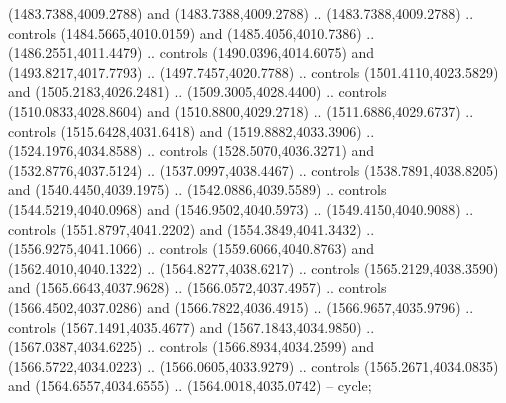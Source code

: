 \begin{scope}[shift={(-343.28256,-575.56596)}]
\begin{scope}[shift={(-736.04956,-3272.8657)}]
\begin{scope}[cm={{0.85919,0.0,0.0,0.85919,(160.29778,612.34137)}}]
        (1483.7388,4009.2788) and (1483.7388,4009.2788) .. (1483.7388,4009.2788) ..
        controls (1484.5665,4010.0159) and (1485.4056,4010.7386) ..
        (1486.2551,4011.4479) .. controls (1490.0396,4014.6075) and
        (1493.8217,4017.7793) .. (1497.7457,4020.7788) .. controls
        (1501.4110,4023.5829) and (1505.2183,4026.2481) .. (1509.3005,4028.4400) ..
        controls (1510.0833,4028.8604) and (1510.8800,4029.2718) ..
        (1511.6886,4029.6737) .. controls (1515.6428,4031.6418) and
        (1519.8882,4033.3906) .. (1524.1976,4034.8588) .. controls
        (1528.5070,4036.3271) and (1532.8776,4037.5124) .. (1537.0997,4038.4467) ..
        controls (1538.7891,4038.8205) and (1540.4450,4039.1975) ..
        (1542.0886,4039.5589) .. controls (1544.5219,4040.0968) and
        (1546.9502,4040.5973) .. (1549.4150,4040.9088) .. controls
        (1551.8797,4041.2202) and (1554.3849,4041.3432) .. (1556.9275,4041.1066) ..
        controls (1559.6066,4040.8763) and (1562.4010,4040.1322) ..
        (1564.8277,4038.6217) .. controls (1565.2129,4038.3590) and
        (1565.6643,4037.9628) .. (1566.0572,4037.4957) .. controls
        (1566.4502,4037.0286) and (1566.7822,4036.4915) .. (1566.9657,4035.9796) ..
        controls (1567.1491,4035.4677) and (1567.1843,4034.9850) ..
        (1567.0387,4034.6225) .. controls (1566.8934,4034.2599) and
        (1566.5722,4034.0223) .. (1566.0605,4033.9279) .. controls
        (1565.2671,4034.0835) and (1564.6557,4034.6555) .. (1564.0018,4035.0742) --
        cycle;


\end{scope}
\end{scope}
\end{scope}
